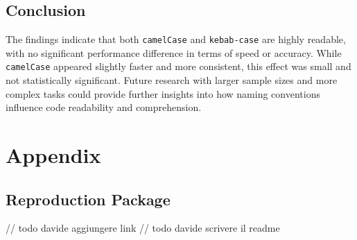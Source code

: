 \documentclass[unicode,11pt,a4paper,oneside,numbers=endperiod,openany]{scrartcl}
\begin{document}
\subsection{Conclusion}
The findings indicate that both \texttt{camelCase} and \texttt{kebab-case} are highly readable, with no significant performance difference in terms of speed or accuracy. While \texttt{camelCase} appeared slightly faster and more consistent, this effect was small and not statistically significant. Future research with larger sample sizes and more complex tasks could provide further insights into how naming conventions influence code readability and comprehension.

\section{Appendix}
\subsection{Reproduction Package}

// todo davide aggiungere link
// todo davide scrivere il readme
\end{document}

